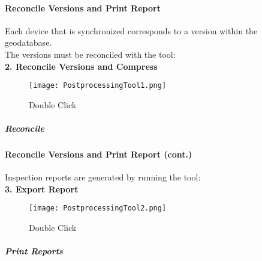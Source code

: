 \clearpage

\paragraph{Reconcile Versions and Print Report}

\vspace{.5in}

Each device that is synchronized corresponds to a version within the geodatabase.\\

\noindent The versions must be reconciled with the tool:\\

\textbf{2. Reconcile Versions and Compress}

\vspace{1in}

\begin{wrapfigure}{r}{0.5\textwidth}

\centering
    \texttt{[image: PostprocessingTool1.png]}
\caption{Double Click}

\end{wrapfigure}
\subparagraph{Reconcile}
\vspace{1.5in}


\clearpage

\paragraph*{Reconcile Versions and Print Report {\footnotesize (cont.)}}

\vspace{.5in}

Inspection reports are generated by running the tool:\\

\textbf{3. Export Report}

\vspace{1in}

\begin{wrapfigure}{r}{0.6\textwidth}

\centering
    \texttt{[image: PostprocessingTool2.png]}
\caption{Double Click}
\end{wrapfigure}
\subparagraph{Print Reports}
\vspace{2in}

